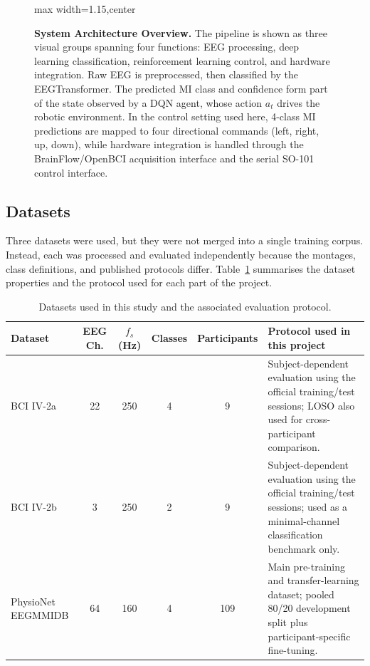 \documentclass[12pt, a4paper]{article}
\begin{document}
\begin{figure}[htbp]
\begin{adjustbox}{max width=1.15\textwidth,center}
    \end{adjustbox}
    \fi
    \caption{\textbf{System Architecture Overview.} The pipeline is shown as three visual groups spanning four functions: EEG processing, deep learning classification, reinforcement learning control, and hardware integration. Raw EEG is preprocessed, then classified by the EEGTransformer. The predicted MI class and confidence form part of the state observed by a DQN agent, whose action $a_t$ drives the robotic environment. In the control setting used here, 4-class MI predictions are mapped to four directional commands (left, right, up, down), while hardware integration is handled through the BrainFlow/OpenBCI acquisition interface and the serial SO-101 control interface.}
    \label{fig:system_overview}
\end{figure}

\subsection{Datasets}

Three datasets were used, but they were not merged into a single training corpus. Instead, each was processed and evaluated independently because the montages, class definitions, and published protocols differ. Table~\ref{tab:datasets_v10} summarises the dataset properties and the protocol used for each part of the project.

\begin{table}[htbp]
\centering
\caption{Datasets used in this study and the associated evaluation protocol.}
\label{tab:datasets_v10}
\begin{tabular}{@{} >{\raggedright\arraybackslash}p{2.5cm} c c c c >{\raggedright\arraybackslash}p{4.3cm} @{}}
\toprule
\textbf{Dataset} & \textbf{EEG Ch.} & \textbf{$f_s$ (Hz)} & \textbf{Classes} & \textbf{Participants} & \textbf{Protocol used in this project} \\
\midrule
BCI IV-2a & 22 & 250 & 4 & 9 & Subject-dependent evaluation using the official training/test sessions; LOSO also used for cross-participant comparison. \\
BCI IV-2b & 3 & 250 & 2 & 9 & Subject-dependent evaluation using the official training/test sessions; used as a minimal-channel classification benchmark only. \\
PhysioNet EEGMMIDB & 64 & 160 & 4 & 109 & Main pre-training and transfer-learning dataset; pooled 80/20 development split plus participant-specific fine-tuning. \\
\bottomrule
\end{tabular}
\end{table}
\end{document}
